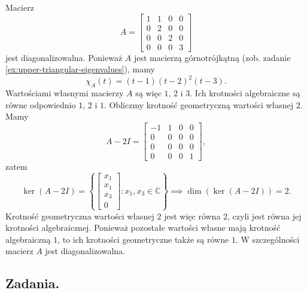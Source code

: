 \begin{example}
	Macierz
	\begin{equation}
		A = \left[\begin{matrix}
			1 & 1 & 0 & 0 \\
			0 & 2 & 0 & 0 \\
			0 & 0 & 2 & 0 \\
			0 & 0 & 0 & 3
		\end{matrix}\right]
	\end{equation}
	jest diagonalizowalna.
	Ponieważ $A$ jest macierzą górnotrójkątną
		(zob. zadanie \ref{ex:upper-triangular-eigenvalues}), mamy
	\begin{equation}
		\chi_A(t) = (t - 1)(t - 2)^2(t - 3).
	\end{equation}
	Wartościami własnymi macierzy $A$ są więc $1$, $2$ i $3$.
	Ich krotności algebraiczne są równe odpowiednio $1$, $2$ i $1$.
	Obliczmy krotność geometryczną wartości własnej $2$.
	Mamy
	\begin{equation}
		A - 2I = \left[\begin{matrix}
			-1 & 1 & 0 & 0 \\
			0 & 0 & 0 & 0 \\
			0 & 0 & 0 & 0 \\
			0 & 0 & 0 & 1
		\end{matrix}\right],
	\end{equation}
	zatem
	\begin{equation}
		\ker(A - 2I) = \left\{\left[\begin{matrix}
			x_1 \\
			x_1 \\
			x_3 \\
			0
		\end{matrix}\right] : x_1, x_3 \in \mathbb{C}\right\}
		\implies
		\dim(\ker(A - 2I)) = 2.
	\end{equation}
	Krotność geometryczna wartości własnej $2$ jest więc równa $2$,
		czyli jest równa jej krotności algebraicznej.
	Ponieważ pozostałe wartości własne mają krotność algebraiczną $1$,
		to ich krotności geometryczne także są równe $1$.
	W szczególności macierz $A$ jest diagonalizowalna.
\end{example}


\subsection{Zadania.}

